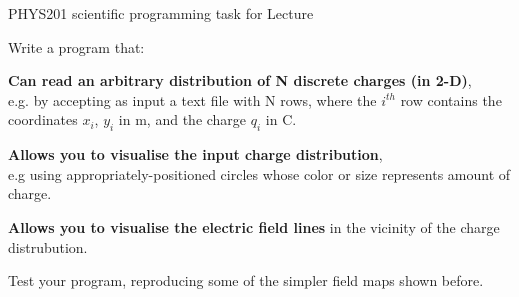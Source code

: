{
\programmingslide

%
%
%

\begin{frame}{PHYS201 scientific programming task for Lecture \thislecture}

{\small

Write a program that:
\begin{itemize}
{\scriptsize
  \item {\bf Can read an arbitrary distribution of N discrete charges (in 2-D)},\\
        e.g. by accepting as input a text file with N rows, where the $i^{th}$
        row contains the coordinates $x_i$, $y_i$ in m, and the charge $q_i$ in C.
  \item {\bf Allows you to visualise the input charge distribution},\\
        e.g using appropriately-positioned circles whose color or size represents amount of charge.
  \item {\bf Allows you to visualise the electric field lines}
        in the vicinity of the charge distrubution.\\
}
\end{itemize}

\vspace{0.2cm}
Test your program, reproducing some of the simpler field maps shown before.\\

}

\end{frame}

} %
